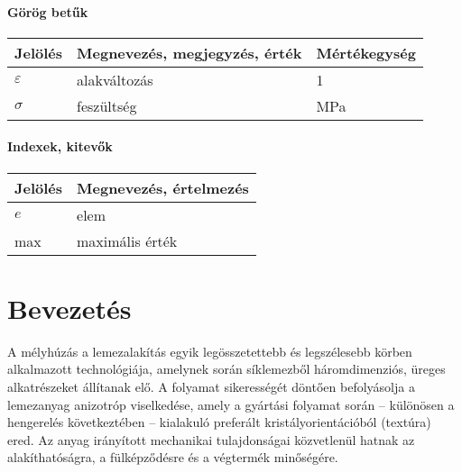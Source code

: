 \documentclass[12pt,a4paper,oneside]{report}
\begin{document}
\subsubsection*{Görög betűk}
\begin{center}
    \begin{tabular}{lp{10cm}l}
        \hline
        Jelölés & Megnevezés, megjegyzés, érték & Mértékegység \\
        \hline
                $\varepsilon$  & alakváltozás           & 1    \\
        $\sigma$  & feszültség                  & MPa             \\

        \hline
    \end{tabular}
\end{center}



\subsubsection*{Indexek, kitevők}
\begin{center}
    \begin{tabular}{lp{12.8cm}}
        \hline
        Jelölés & Megnevezés, értelmezés\\
        \hline
        $e$     & elem  \\
        max     & maximális érték        \\
        \hline
    \end{tabular}
\end{center}


\def\arraystretch{1}%

\cleardoublepage
{}
\chapter{Bevezetés}

A mélyhúzás a lemezalakítás egyik legösszetettebb és legszélesebb körben alkalmazott technológiája, amelynek során síklemezből háromdimenziós, üreges alkatrészeket állítanak elő. A folyamat sikerességét döntően befolyásolja a lemezanyag anizotróp viselkedése, amely a gyártási folyamat során – különösen a hengerelés következtében – kialakuló preferált kristályorientációból (textúra) ered. Az anyag irányított mechanikai tulajdonságai közvetlenül hatnak az alakíthatóságra, a fülképződésre és a végtermék minőségére.
\end{document}
